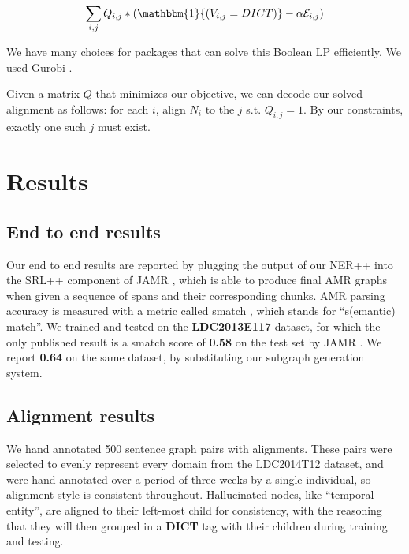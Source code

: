 \documentclass[11pt]{article}
\begin{document}
\[\sum_{i,j} Q_{i,j}*(\mathbbm{1}{(V_{i,j} = DICT)} - \alpha \mathcal{E}_{i,j})\]

We have many choices for packages that can solve this Boolean LP efficiently. We used Gurobi \needcite.

Given a matrix $Q$ that minimizes our objective, we can decode our solved alignment as follows: for each $i$, align $N_i$ to the $j$ s.t. $Q_{i,j} = 1$. By our constraints, exactly one such $j$ must exist.

\section{Results}

\subsection{End to end results}

Our end to end results are reported by plugging the output of our NER++ into the SRL++ component of JAMR \cite{Flanigan:14}, which is able to produce final AMR graphs when given a sequence of spans and their corresponding chunks. AMR parsing accuracy is measured with a metric called smatch \needcite, which stands for ``s(emantic) match''. We trained and tested on the \textbf{LDC2013E117} dataset, for which the only published result is a smatch score of \textbf{0.58} on the test set by JAMR \cite{Flanigan:14}. We report \textbf{0.64} on the same dataset, by substituting our subgraph generation system.

\subsection{Alignment results}

We hand annotated 500 sentence graph pairs with alignments. These pairs were selected to evenly represent every domain from the LDC2014T12 dataset, and were hand-annotated over a period of three weeks by a single individual, so alignment style is consistent throughout. Hallucinated nodes, like ``temporal-entity'', are aligned to their left-most child for consistency, with the reasoning that they will then grouped in a \textbf{DICT} tag with their children during training and testing.


\end{document}
